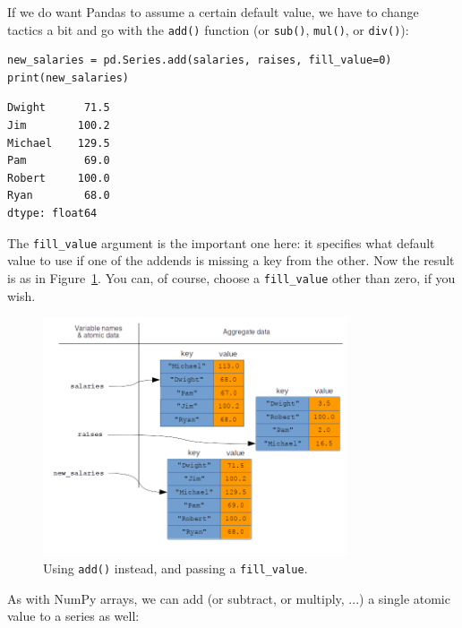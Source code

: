 
If we do want Pandas to assume a certain default value, we have to change
tactics a bit and go with the \texttt{add()} function (or \texttt{sub()},
\texttt{mul()}, or \texttt{div()}):

\begin{Verbatim}[fontsize=\small,samepage=true,frame=single]
new_salaries = pd.Series.add(salaries, raises, fill_value=0)
print(new_salaries)
\end{Verbatim}

\begin{Verbatim}[fontsize=\small,samepage=true,frame=leftline,framesep=5mm,framerule=1mm]
Dwight      71.5
Jim        100.2
Michael    129.5
Pam         69.0
Robert     100.0
Ryan        68.0
dtype: float64
\end{Verbatim}

The \texttt{fill\_value} argument is the important one here: it specifies what
default value to use if one of the addends is missing a key from the other. Now
the result is as in Figure~\ref{fig:vectorizedPandas3}. You can, of course,
choose a \texttt{fill\_value} other than zero, if you wish.

\begin{figure}[ht]
\centering
\includegraphics[width=0.8\textwidth]{vectorizedPandas3.png}
\caption{Using \texttt{add()} instead, and passing a \texttt{fill\_value}.}
\label{fig:vectorizedPandas3}
\end{figure}

As with NumPy arrays, we can add (or subtract, or multiply, ...) a single
atomic value to a series as well:

